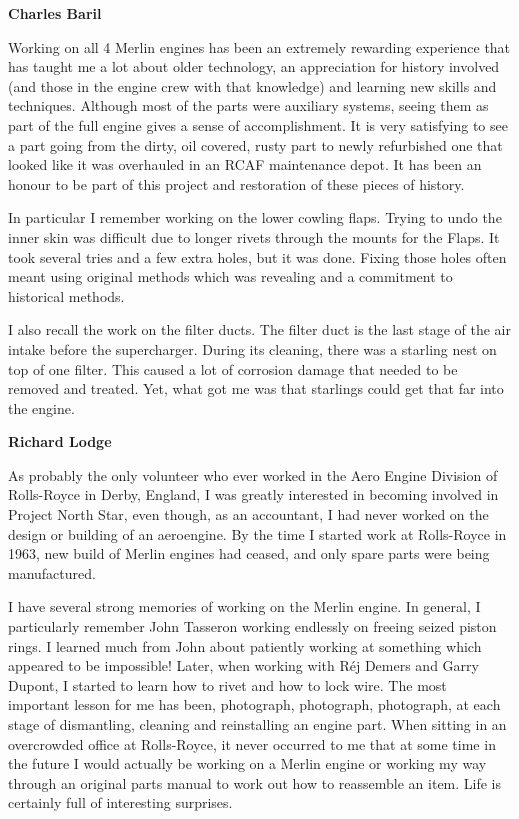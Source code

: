 \textbf{Charles Baril}

Working on all 4 Merlin engines has been an extremely rewarding experience that
has taught me a lot about older technology, an appreciation for history
involved (and those in the engine crew with that knowledge) and learning new
skills and techniques. Although most of the parts were auxiliary systems,
seeing them as part of the full engine gives a sense of accomplishment. It is
very satisfying to see a part going from the dirty, oil covered, rusty part to
newly refurbished one that looked like it was overhauled in an RCAF maintenance
depot. It has been an honour to be part of this project and restoration of
these pieces of history.

In particular I remember working on the lower cowling flaps.  Trying to undo
the inner skin was difficult due to longer rivets through the mounts for the
Flaps. It took several tries and a few extra holes, but it was done. Fixing
those holes often meant using original methods which was revealing and a
commitment to historical methods.

I also recall the work on the filter ducts.  The filter duct is the last stage
of the air intake before the supercharger. During its cleaning, there was a
starling nest on top of one filter. This caused a lot of corrosion damage that
needed to be removed and treated. Yet, what got me was that starlings could get
that far into the engine.

\textbf{Richard Lodge}

As probably the only volunteer who ever worked in the Aero Engine Division of
Rolls-Royce in Derby, England, I was greatly interested in becoming involved in
Project North Star, even though, as an accountant, I had never worked on the
design or building of an aeroengine.  By the time I started work at Rolls-Royce
in 1963, new build of Merlin engines had ceased, and only spare parts were
being manufactured.

I have several strong memories of working on the Merlin engine.  In general,  I
particularly remember John Tasseron working endlessly on freeing seized piston
rings.  I learned much from John about patiently working at something which
appeared to be impossible! Later, when working with  R\'{e}j Demers and Garry
Dupont, I started to learn how to rivet and how to lock wire. The most
important lesson for me has been, photograph, photograph, photograph, at each
stage of dismantling, cleaning and reinstalling an engine part. When sitting in
an overcrowded office at Rolls-Royce, it never occurred to me that at some time
in the future I would actually be working on a Merlin engine or working my way
through an original parts manual to work out how to reassemble an item.  Life
is certainly full of interesting surprises.

